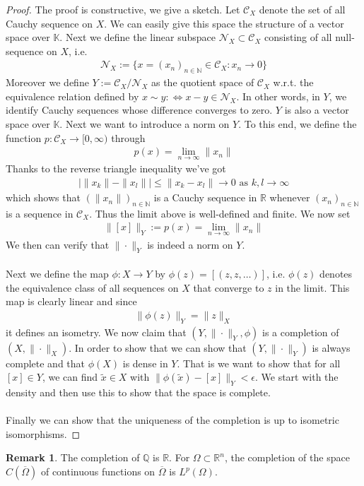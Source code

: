 \documentclass[11pt,a4paper]{article}
\theoremstyle{definition}
\newtheorem{rem}{Remark}[section]
\begin{document}
\begin{proof}
The proof is constructive, we give a sketch.  Let $\mathcal{C}_X$ denote the set of all Cauchy sequence on $X$. We can easily give this space the structure of a vector space over $\mathbb{K}$. Next we define the linear subspace $\mathcal{N}_X \subset \mathcal{C}_X$ consisting of all null-sequence on $X$, i.e.
\begin{align*}
\mathcal{N}_X := \lbrace x = (x_n)_{n \in \mathbb{N}} \in \mathcal{C}_X : x_n \to 0 \rbrace
\end{align*}
Moreover we define $Y:= \mathcal{C}_X/ \mathcal{N}_X$ as the quotient space of $\mathcal{C}_X$ w.r.t. the equivalence relation defined by $x \sim y : \iff x-y \in \mathcal{N}_X$. In other words, in $Y$, we identify Cauchy sequences whose difference converges to zero. $Y$ is also a vector space over $\mathbb{K}$. 
\newpage
Next we want to introduce a norm on $Y$. To this end, we define the function $p: \mathcal{C}_X \to [0, \infty)$ through 
\begin{align*}
p(x)= \lim_{n \to \infty} \| x_n \|
\end{align*}
Thanks to the reverse triangle inequality we've got
\begin{align*}
| \|x_k\| - \|x_l\| | \leq \|x_k - x_l\| \to 0 \text{ as } k,l \to \infty
\end{align*}
which shows that $(\|x_n\|)_{n \in \mathbb{N}}$ is a Cauchy sequence in $\mathbb{R}$ whenever $(x_n)_{n \in \mathbb{N}}$ is a sequence in $\mathcal{C}_X$. Thus the limit above is well-defined and finite. We now set 
\begin{align*}
\|[x]\|_Y := p(x)= \lim_{n \to \infty} \|x_n\|
\end{align*}
We then can verify that $\| \cdot \|_Y$ is indeed a norm on $Y$. \\
\\
Next we define the map $\phi : X \to Y$ by $\phi (z)=[(z,z, \dots )]$, i.e. $\phi(z)$ denotes the equivalence class of all sequences on $X$ that converge to $z$ in the limit. This map is clearly linear and since 
\begin{align*}
\| \phi(z)\|_Y= \|z\|_X
\end{align*}
it defines an isometry. We now claim that $(Y, \| \cdot \|_Y, \phi)$ is a completion of $(X, \| \cdot \|_X)$. In order to show that we can show that $( Y, \| \cdot \|_Y)$ is always complete and that $\phi(X)$ is dense in $Y$. That is we want to show that for all $[x] \in Y$, we can find $\tilde{x} \in X$ with $\| \phi(\tilde{x}) - [x]\|_Y < \epsilon$. We start with the density and then use this to show that the space is complete. 
\\\\
Finally we can show that the uniqueness of the completion is up to isometric isomorphisms. 
\end{proof}
\begin{rem} The completion of $\mathbb{Q}$ is $\mathbb{R}$. For $\Omega \subset \mathbb{R}^n$, the completion of the space $C( \overline{\Omega})$ of continuous functions on $\overline{\Omega}$ is $L^p(\Omega)$.
\end{rem}
\end{document}
